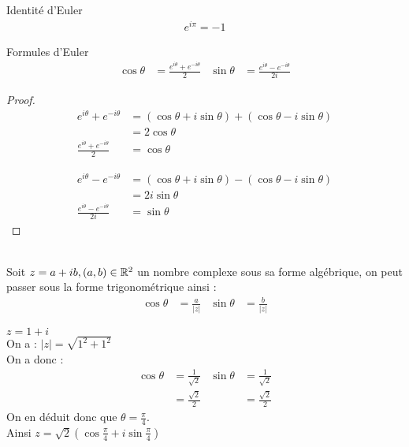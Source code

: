 \begin{proposition}{Identité d'Euler}
    \begin{align*}
        e^{i \pi} = -1
    \end{align*}
\end{proposition}

\begin{proposition}{Formules d'Euler}
    \begin{align*}
        \cos{\theta} &= \frac{e^{i\theta} + e^{-i\theta}}{2} & \sin{\theta} &= \frac{e^{i\theta} - e^{-i\theta}}{2i}
    \end{align*}
    \begin{proof}
        \begin{align*}
            e^{i\theta} + e^{-i\theta} &= (\cos{\theta} + i\sin{\theta}) + (\cos{\theta} - i\sin{\theta}) \\
                                       &= 2\cos{\theta} \\
        \frac{e^{i\theta} + e^{-i\theta}}{2} &= \cos{\theta}
        \end{align*}
        
        \begin{align*}
            e^{i\theta} - e^{-i\theta} &= (\cos{\theta} + i\sin{\theta}) - (\cos{\theta} - i\sin{\theta}) \\
                                       &= 2i\sin{\theta} \\
            \frac{e^{i\theta} - e^{-i\theta}}{2i} &= \sin{\theta} 
        \end{align*}
    \end{proof}
\end{proposition}

\begin{remarque}~ 
    \\
    Soit $z = a + ib, (a, b) \in \mathbb{R}^2$ un nombre complexe sous sa forme algébrique, on peut passer sous la forme trigonométrique ainsi :
    \begin{align*}
        \cos{\theta} &= \frac{a}{|z|} & \sin{\theta} &= \frac{b}{|z|}
    \end{align*}
    \begin{exemple}
        $z = 1 + i$
        \\
        On a : $|z| = \sqrt{1^2 + 1^2}$
        \\
        On a donc :
        \begin{align*}
            \cos{\theta} &= \frac{1}{\sqrt{2}} & \sin{\theta} &= \frac{1}{\sqrt{2}} \\
                         &= \frac{\sqrt{2}}{2} &              &= \frac{\sqrt{2}}{2}
        \end{align*}
        On en déduit donc que $\theta = \frac{\pi}{4}$. \\
        Ainsi $z = \sqrt{2}\left(\cos{\frac{\pi}{4}} + i\sin{\frac{\pi}{4}}\right)$
    \end{exemple}
\end{remarque}

